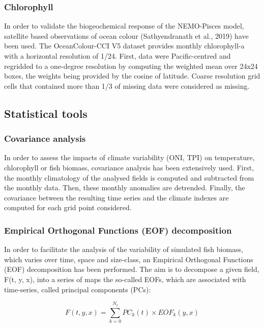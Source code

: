 \subsubsection{Chlorophyll}

In order to validate the biogeochemical response of the NEMO-Pisces model, satellite based observations of ocean colour (Sathyendranath et al., 2019) have been used. The OceanColour-CCI V5 dataset provides monthly chlorophyll-a with a horizontal resolution of 1/24\degree{}. First, data were Pacific-centred and regridded to a one-degree resolution by computing the weighted mean over 24x24 boxes, the weights being provided by the cosine of latitude. Coarse resolution grid cells that contained more than 1/3 of missing data were considered as missing. \\ 

\subsection{Statistical tools} 

\subsubsection{Covariance analysis}

In order to assess the impacts of climate variability (ONI, TPI) on temperature, chlorophyll or fish biomass, covariance analysis has been extensively used. First, the monthly climatology of the analysed fields is computed and subtracted from the monthly data. Then, these monthly anomalies are detrended. Finally, the covariance between the resulting time series and the climate indexes are computed for each grid point considered.

\subsubsection{Empirical Orthogonal Functions (EOF) decomposition}

In order to facilitate the analysis of the variability of simulated fish biomass, which varies over time, space and size-class, an Empirical Orthogonal Functions (EOF) decomposition has been performed. The aim is to decompose a given field, F(t, y, x), into a series of maps the so-called EOFs, which are associated with time-series, called principal components (PCs):

\begin{displaymath}
F(t, y, x) = \sum_{k=0}^{N_t} PC_k(t) \times EOF_k(y, x) 
\end{displaymath}

